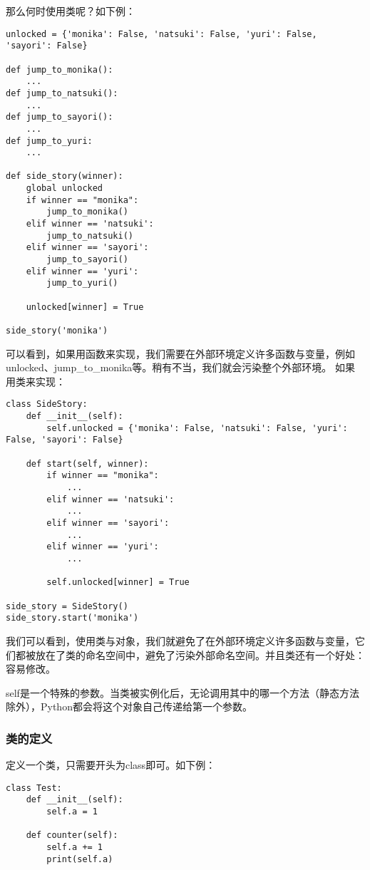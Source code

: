 那么何时使用类呢？如下例：
\begin{lstlisting}
unlocked = {'monika': False, 'natsuki': False, 'yuri': False, 'sayori': False}

def jump_to_monika():
    ...
def jump_to_natsuki():
    ...
def jump_to_sayori():
    ...
def jump_to_yuri:
    ...

def side_story(winner):
    global unlocked
    if winner == "monika":
        jump_to_monika()
    elif winner == 'natsuki':
        jump_to_natsuki()
    elif winner == 'sayori':
        jump_to_sayori()
    elif winner == 'yuri':
        jump_to_yuri()

    unlocked[winner] = True

side_story('monika')

\end{lstlisting}
可以看到，如果用函数来实现，我们需要在外部环境定义许多函数与变量，例如unlocked、jump\_to\_monika等。稍有不当，我们就会污染整个外部环境。
如果用类来实现：
\begin{lstlisting}
class SideStory:
    def __init__(self):
        self.unlocked = {'monika': False, 'natsuki': False, 'yuri': False, 'sayori': False}

    def start(self, winner):
        if winner == "monika":
            ...
        elif winner == 'natsuki':
            ...
        elif winner == 'sayori':
            ...
        elif winner == 'yuri':
            ...
        
        self.unlocked[winner] = True

side_story = SideStory()
side_story.start('monika')
\end{lstlisting}
我们可以看到，使用类与对象，我们就避免了在外部环境定义许多函数与变量，它们都被放在了类的命名空间中，避免了污染外部命名空间。并且类还有一个好处：容易修改。

\begin{ExtraKnowledge}
    self是一个特殊的参数。当类被实例化后，无论调用其中的哪一个方法（静态方法除外），Python都会将这个对象自己传递给第一个参数。
\end{ExtraKnowledge}

\subsubsection{类的定义}
定义一个类，只需要开头为class即可。如下例：

\begin{lstlisting}
class Test:
    def __init__(self):
        self.a = 1

    def counter(self):
        self.a += 1
        print(self.a)
\end{lstlisting}


